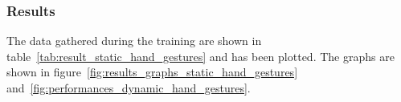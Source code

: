 \documentclass[../thesis.tex]{subfiles}
\begin{document}
\subsubsection{Results}
The data gathered during the training are shown in table~\ref{tab:result_static_hand_gestures} and has been plotted. The graphs are shown in figure~\ref{fig:results_graphs_static_hand_gestures} and~\ref{fig:performances_dynamic_hand_gestures}.
\begin{table}[H]
\caption{Results for training the static hand gesture recognizer.}
\label{tab:result_static_hand_gestures}
\end{table}
\end{document}
